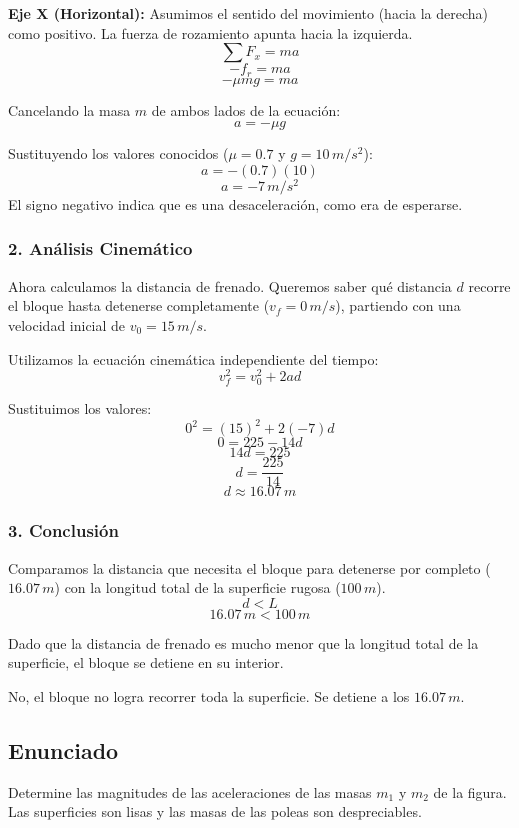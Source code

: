 \documentclass[12pt, a4paper]{article}
\begin{document}
\textbf{Eje X (Horizontal):}
Asumimos el sentido del movimiento (hacia la derecha) como positivo. La fuerza de rozamiento apunta hacia la izquierda.
$$ \sum F_x = m a $$
$$ -f_r = m a $$
$$ -\mu m g = m a $$

Cancelando la masa $m$ de ambos lados de la ecuación:
$$ a = -\mu g $$

Sustituyendo los valores conocidos ($\mu = 0.7$ y $g = 10 \, \si{m/s^2}$):
$$ a = -(0.7)(10) $$
$$ a = -7 \, \si{m/s^2} $$
El signo negativo indica que es una desaceleración, como era de esperarse.

\subsubsection*{2. Análisis Cinemático}
Ahora calculamos la distancia de frenado. Queremos saber qué distancia $d$ recorre el bloque hasta detenerse completamente ($v_f = 0 \, \si{m/s}$), partiendo con una velocidad inicial de $v_0 = 15 \, \si{m/s}$.

Utilizamos la ecuación cinemática independiente del tiempo:
$$ v_f^2 = v_0^2 + 2 a d $$

Sustituimos los valores:
$$ 0^2 = (15)^2 + 2 (-7) d $$
$$ 0 = 225 - 14 d $$
$$ 14 d = 225 $$
$$ d = \frac{225}{14} $$
$$ d \approx 16.07 \, \si{m} $$

\subsubsection*{3. Conclusión}
Comparamos la distancia que necesita el bloque para detenerse por completo ($16.07 \, \si{m}$) con la longitud total de la superficie rugosa ($100 \, \si{m}$).
$$ d < L $$
$$ 16.07 \, \si{m} < 100 \, \si{m} $$

Dado que la distancia de frenado es mucho menor que la longitud total de la superficie, el bloque se detiene en su interior.

\begin{tcolorbox}[colback=green!5!white, colframe=green!50!black, title=Respuesta Final]
\centering
No, el bloque no logra recorrer toda la superficie. Se detiene a los $16.07 \, \si{m}$.
\end{tcolorbox}

\newpage

\subsection*{Enunciado}
Determine las magnitudes de las aceleraciones de las masas $m_1$ y $m_2$ de la figura. Las superficies son lisas y las masas de las poleas son despreciables.
\end{document}
